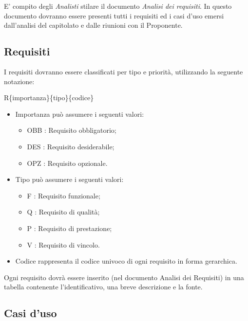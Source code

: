 E' compito degli \textit{Analisti} stilare il documento \textit{Analisi dei requisiti}.
In questo documento dovranno essere presenti tutti i requisiti ed i casi d'uso emersi dall'analisi del capitolato e dalle riunioni con il Proponente.\\

\subsection{Requisiti}

I requisiti dovranno essere classificati per tipo e priorità, utilizzando la seguente notazione:

R\{importanza\}\{tipo\}\{codice\}
\begin{itemize}
  \item Importanza può assumere i seguenti valori:
\begin{itemize}
	\item {OBB} : Requisito obbligatorio;
	\item {DES} : Requisito desiderabile;
	\item {OPZ} : Requisito opzionale.
\end{itemize}
  \item Tipo può assumere i seguenti valori:
\begin{itemize}
	\item {F} : Requisito funzionale;
	\item {Q} : Requisito di qualità;
	\item {P} : Requisito di prestazione;
	\item {V} : Requisito di vincolo.
\end{itemize}
  \item Codice rappresenta il codice univoco di ogni requisito in forma gerarchica.
\end{itemize}
Ogni requisito dovrà essere inserito (nel documento Analisi dei Requisiti) in una tabella contenente l'identificativo, una breve descrizione e la fonte.

\subsection{Casi d'uso}

